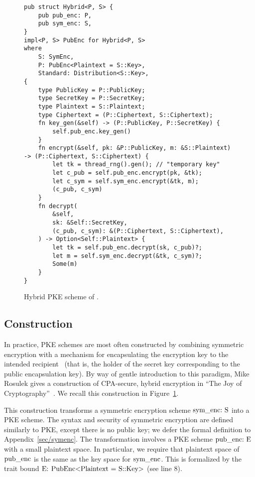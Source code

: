 \documentclass{article}
\newcommand{\code}[1]{\textrm{\textup{\lstinline{#1}}}}
\begin{document}
\begin{figure}[t]
\begin{lstlisting}
pub struct Hybrid<P, S> {
    pub pub_enc: P,
    pub sym_enc: S,
}
impl<P, S> PubEnc for Hybrid<P, S>
where
    S: SymEnc,
    P: PubEnc<Plaintext = S::Key>,
    Standard: Distribution<S::Key>,
{
    type PublicKey = P::PublicKey;
    type SecretKey = P::SecretKey;
    type Plaintext = S::Plaintext;
    type Ciphertext = (P::Ciphertext, S::Ciphertext);
    fn key_gen(&self) -> (P::PublicKey, P::SecretKey) {
        self.pub_enc.key_gen()
    }
    fn encrypt(&self, pk: &P::PublicKey, m: &S::Plaintext) -> (P::Ciphertext, S::Ciphertext) {
        let tk = thread_rng().gen(); // "temporary key"
        let c_pub = self.pub_enc.encrypt(pk, &tk);
        let c_sym = self.sym_enc.encrypt(&tk, m);
        (c_pub, c_sym)
    }
    fn decrypt(
        &self,
        sk: &Self::SecretKey,
        (c_pub, c_sym): &(P::Ciphertext, S::Ciphertext),
    ) -> Option<Self::Plaintext> {
        let tk = self.pub_enc.decrypt(sk, c_pub)?;
        let m = self.sym_enc.decrypt(&tk, c_sym)?;
        Some(m)
    }
}
\end{lstlisting}
  \caption{Hybrid PKE scheme of \cite[Construction 15.8]{joy}.}
  \label{fig/hybrid}
\end{figure}


\subsection{Construction}

In practice, PKE schemes are most often constructed by combining symmetric
encryption with a mechanism for encapsulating the encryption key to the
intended recipient~\cite{rfc9180} (that is, the holder of the secret key
corresponding to the public encapsulation key).
%
By way of gentle introduction to this paradigm, Mike Rosulek gives a
construction of CPA-secure, hybrid encryption in ``The Joy of
Cryptography''~\cite{joy}.
%
We recall this construction in Figure~\ref{fig/hybrid}.

This construction transforms a symmetric encryption scheme $\code{sym_enc: S}$
into a PKE scheme.
%
The syntax and security of symmetric encryption are defined similarly to PKE,
except there is no public key; we defer the formal definition to
Appendix~\ref{sec/symenc}.
%
The transformation involves a PKE scheme $\code{pub_enc: E}$ with a small
plaintext space. In particular, we require that plaintext space of
$\code{pub_enc}$ is the same as the key space for $\code{sym_enc}$. This is
formalized by the trait bound $\code{E: PubEnc<Plaintext = S::Key>}$ (see line
8).
\end{document}
